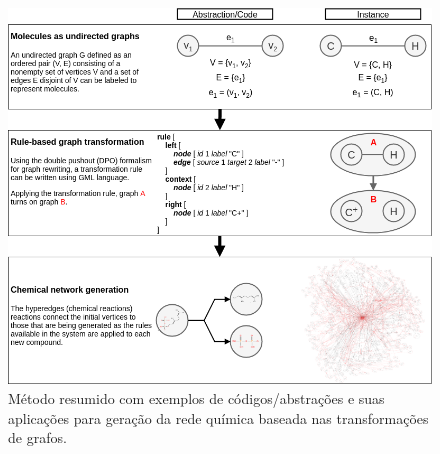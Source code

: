 \begin{figure}[htbp]
	\centering
	\includegraphics[width=\linewidth]{images/BIBM2019DanielaMethod.png}
	\caption{{Método resumido com exemplos de códigos/abstrações e suas aplicações para geração da rede química baseada nas transformações de grafos.}}
	\label{figMethodSummary}
\end{figure}







